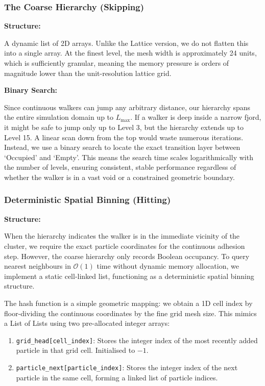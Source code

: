 \documentclass[12pt, a4paper, oneside]{report}
\theoremstyle{remark}
\begin{document}
\subsubsection{The Coarse Hierarchy (Skipping)}
\noindent \textbf{Structure:} 

A dynamic list of 2D arrays. Unlike the Lattice version, we do not flatten this into a single array. At the finest level, the mesh width is approximately 24 units, which is sufficiently granular, meaning the memory pressure is orders of magnitude lower than the unit-resolution lattice grid.

\vspace{0.2em}
\noindent \textbf{Binary Search:} 

Since continuous walkers can jump any arbitrary distance, our hierarchy spans the entire simulation domain up to $L_{\text{max}}$. If a walker is deep inside a narrow fjord, it might be safe to jump only up to Level 3, but the hierarchy extends up to Level 15. A linear scan down from the top would waste numerous iterations. Instead, we use a binary search to locate the exact transition layer between `Occupied' and `Empty'. This means the search time scales logarithmically with the number of levels, ensuring consistent, stable performance regardless of whether the walker is in a vast void or a constrained geometric boundary.

\subsubsection{Deterministic Spatial Binning (Hitting)}
\noindent \textbf{Structure:} 

When the hierarchy indicates the walker is in the immediate vicinity of the cluster, we require the exact particle coordinates for the continuous adhesion step. However, the coarse hierarchy only records Boolean occupancy. To query nearest neighbours in $\mathcal{O}(1)$ time without dynamic memory allocation, we implement a static cell-linked list, functioning as a deterministic spatial binning structure.

The hash function is a simple geometric mapping: we obtain a 1D cell index by floor-dividing the continuous coordinates by the fine grid mesh size. This mimics a List of Lists using two pre-allocated integer arrays:
\begin{enumerate}
    \item \texttt{grid\_head[cell\_index]}: Stores the integer index of the most recently added particle in that grid cell. Initialised to $-1$.
    \item \texttt{particle\_next[particle\_index]}: Stores the integer index of the next particle in the same cell, forming a linked list of particle indices.
\end{enumerate}
\end{document}
